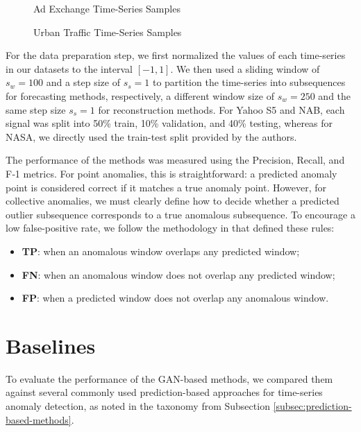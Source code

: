 \begin{figure}[H]
  \centering
  \hfill
  \hfill
  \hfill
  \caption{\small Ad Exchange Time-Series Samples}
\end{figure}

\begin{figure}[H]
    \hfill
    \hfill
    \hfill
    \caption{\small Urban Traffic Time-Series Samples}
\end{figure}

For the data preparation step, we first normalized the values of each time-series in our datasets to the interval $[-1, 1]$. We then used a sliding window of $s_w=100$ and a step size of $s_s=1$ to partition the time-series into subsequences for forecasting methods, respectively, a different window size of $s_w=250$ and the same step size $s_s=1$ for reconstruction methods. For Yahoo S5 and NAB, each signal was split into 50\% train, 10\% validation, and 40\% testing, whereas for NASA, we directly used the train-test split provided by the authors.

The performance of the methods was measured using the Precision, Recall, and F‑1 metrics. For point anomalies, this is straightforward: a predicted anomaly point is considered correct if it matches a true anomaly point. However, for collective anomalies, we must clearly define how to decide whether a predicted outlier subsequence corresponds to a true anomalous subsequence. To encourage a low false-positive rate, we follow the methodology in \cite{hundman2018detecting} that defined these rules:
\begin{itemize}
    \item \textbf{TP}: when an anomalous window overlaps any predicted window;
    \item \textbf{FN}: when an anomalous window does not overlap any predicted window; 
    \item \textbf{FP}: when a predicted window does not overlap any anomalous window.
\end{itemize}

\section*{Baselines}
\label{sec:05-baselines}
To evaluate the performance of the GAN-based methods, we compared them against several commonly used prediction-based approaches for time-series anomaly detection, as noted in the taxonomy from Subsection \ref{subsec:prediction-based-methods}. 

